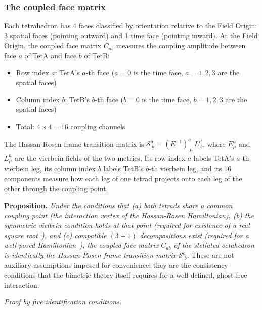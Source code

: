 \documentclass[aps,prd,preprint,superscriptaddress,showpacs,preprintnumbers,amsmath,amssymb,nofootinbib]{revtex4-2}
\begin{document}
\subsubsection*{The coupled face matrix}

Each tetrahedron has 4 faces classified by orientation relative to the Field Origin: 3 spatial faces (pointing outward) and 1 time face (pointing inward). At the Field Origin, the coupled face matrix $C_{ab}$ measures the coupling amplitude between face $a$ of TetA and face $b$ of TetB:
\begin{itemize}
\item Row index $a$: TetA's $a$-th face ($a = 0$ is the time face, $a = 1,2,3$ are the spatial faces)
\item Column index $b$: TetB's $b$-th face ($b = 0$ is the time face, $b = 1,2,3$ are the spatial faces)
\item Total: $4 \times 4 = 16$ coupling channels
\end{itemize}

The Hassan-Rosen frame transition matrix is $\mathcal{S}^a_{\;b} = (E^{-1})^a_{\;\mu}\,L^\mu_{\;b}$, where $E^a_\mu$ and $L^a_\mu$ are the vierbein fields of the two metrics. Its row index $a$ labels TetA's $a$-th vierbein leg, its column index $b$ labels TetB's $b$-th vierbein leg, and its 16 components measure how each leg of one tetrad projects onto each leg of the other through the coupling point.

\vspace{0.5em}
\noindent\textbf{Proposition.} \textit{Under the conditions that (a) both tetrads share a common coupling point (the interaction vertex of the Hassan-Rosen Hamiltonian), (b) the symmetric vielbein condition holds at that point (required for existence of a real square root~\cite{deffayet2013}), and (c) compatible $(3{+}1)$ decompositions exist (required for a well-posed Hamiltonian~\cite{hassankocic2018}), the coupled face matrix $C_{ab}$ of the stellated octahedron is identically the Hassan-Rosen frame transition matrix $\mathcal{S}^a_{\;b}$.} These are not auxiliary assumptions imposed for convenience; they are the consistency conditions that the bimetric theory itself requires for a well-defined, ghost-free interaction.
\vspace{0.5em}

\noindent\textit{Proof by five identification conditions.}
\end{document}
